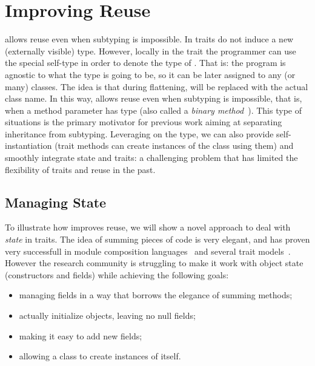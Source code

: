 \saveSpace\saveSpace\section{Improving Reuse}\saveSpace
\name allows reuse even when subtyping is impossible.
In \name traits do not induce a new (externally visible) type.
However, locally in the trait the programmer can use the special self-type \Q@This@ in order to denote the 
type of \Q@this@.
That is: the program is agnostic to what the \Q@This@ type is going to be, so it can
be later assigned to any (or many) classes. 
The idea is that during flattening, \Q@This@ will be replaced with the actual class name.
In this way, \name allows reuse even when subtyping is
impossible, that is, when a method parameter has type \Q@This@ (also
called a \emph{binary
  method}~\cite{bruce96binary}). 
This type of situations is the primary motivator
for previous work aiming at separating inheritance from subtyping.
Leveraging on the \Q@This@ type, we can also provide self-instantiation (trait methods can create instances of the class using them) and smoothly integrate state and traits: a challenging problem that has limited the flexibility of traits and
reuse in the past.

\subsection{Managing State}

To illustrate how \name improves reuse, we will show a novel approach
to deal with \emph{state} in traits.  The idea of summing pieces of
code is very elegant, and has proven very successfull in module
composition languages~\cite{ancona2002calculus} and several trait
models~\cite{Traits:ECOOP2003,Bergel2007,BETTINI2013521,fjig}.  However the research
community is struggling to make it work with object state (constructors
and fields) while achieving the following goals:

\begin{itemize}
\item managing fields in a way that borrows the elegance of summing methods;
\item actually initialize objects, leaving no null fields;
\item making it easy to add new fields;
\item allowing a class to create instances of itself.
\end{itemize}

